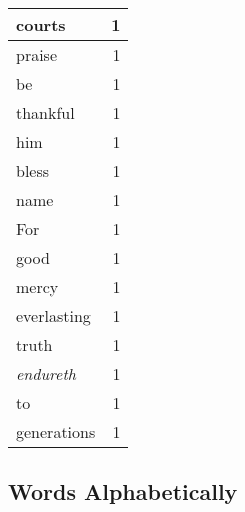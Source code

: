 \begin{center}
\begin{longtable}{l|r}
courts & 1 \\ \hline
praise & 1 \\ \hline
be & 1 \\ \hline
thankful & 1 \\ \hline
him & 1 \\ \hline
bless & 1 \\ \hline
name & 1 \\ \hline
For & 1 \\ \hline
good & 1 \\ \hline
mercy & 1 \\ \hline
everlasting & 1 \\ \hline
truth & 1 \\ \hline
\emph{endureth} & 1 \\ \hline
to & 1 \\ \hline
generations & 1 \\ \hline
\end{longtable}
\end{center}



\normalsize



\subsection{Words Alphabetically}


